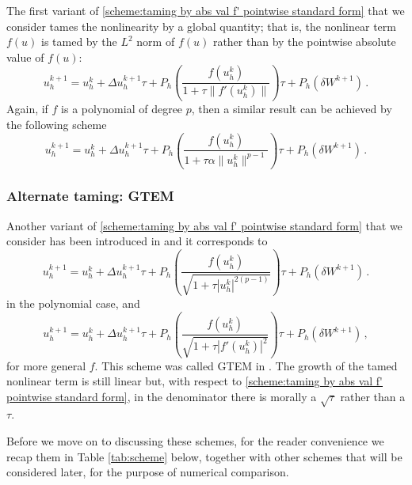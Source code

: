\documentclass[reqno, 11pt]{amsart}
\theoremstyle{plain}
\theoremstyle{definition}
\theoremstyle{remark}
\numberwithin{equation}{section}
\numberwithin{theorem}{section}
\begin{document}
{The first variant of \eqref{scheme:taming by abs val f' pointwise standard form} that we consider tames the nonlinearity by a global quantity; that is, the nonlinear term $f(u)$ is tamed by the  $L^2$ norm of $f(u)$ rather than by the pointwise absolute value of $f(u)$:
\begin{equation}\label{scheme:tame by norm of f'(u)}
u_h^{k+1} = u_h^{k} +  \Delta u_h^{k+1} \tau + P_h\left(
\frac{f(u_h^{k})}{1+\tau \|f'(u_h^k)\|}\right)  \tau +  P_h(\delta W^{k+1}) \,.
\end{equation}
Again, if $f$ is a polynomial of degree $p$, then a similar result can be achieved by the following scheme
\begin{equation}\label{scheme:taming2}
u_h^{k+1} = u_h^{k} +  \Delta u_h^{k+1} \tau +
P_h\left(\frac{f(u_h^{k})}{1+\tau \alpha \|u_h^k\|^{p-1}}\right) \tau +  P_h(\delta W^{k+1}) \,. 
\end{equation}


\subsubsection{Alternate taming: GTEM}
Another variant of \eqref{scheme:taming by abs val f' pointwise standard form} that we consider has been introduced  in \cite{liu2025geometric} and it corresponds to 
\begin{equation}\label{scheme: GTEM scheme}
    u_h^{k+1} = u_h^k + \Delta u_h^{k+1} \tau + P_h\left( \frac{f(u_h^k)}{\sqrt{1+\tau |u_h^k|^{2(p-1)}}} \right)\tau + P_h (\delta W^{k+1}) \,.  
\end{equation}
in the polynomial case, and
\begin{equation}\label{scheme: GTEM scheme f}
    u_h^{k+1} = u_h^k + \Delta u_h^{k+1} \tau + P_h\left( \frac{f(u_h^k)}{\sqrt{1+\tau  |f'(u_h^k)|^2}} \right)\tau + P_h (\delta W^{k+1}) \,,  
\end{equation}
for more general $f$. This scheme was called GTEM in \cite{liu2025geometric}. 
The growth of the tamed nonlinear term is still linear but, with respect to \eqref{scheme:taming by abs val f' pointwise standard form}, in the denominator there is morally a $\sqrt{\tau}$ rather than a $\tau$.  

Before we move on to discussing these schemes, for the reader convenience we recap them in Table \ref{tab:scheme} below, together with other schemes that will be considered later, for the purpose of numerical comparison. 

\begin{table}[ht]
\caption{Summary of numerical schemes explored and compared in this manuscript.}
\label{tab:scheme}
\small
\centering


\end{table}}
\end{document}
